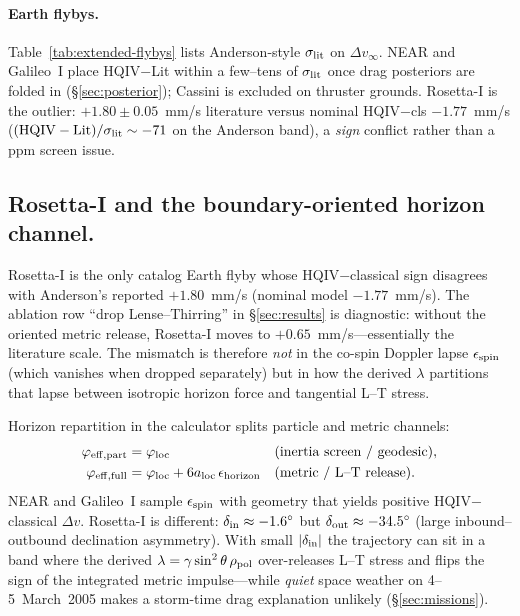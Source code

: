 \documentclass[11pt]{amsart}
\begin{document}
\paragraph{Earth flybys.}
Table~\ref{tab:extended-flybys} lists Anderson-style $\sigma_{\rm lit}$ on $\Delta v_\infty$.
NEAR and Galileo~I place HQIV$-$Lit within a few--tens of $\sigma_{\rm lit}$ once drag
posteriors are folded in (\S\ref{sec:posterior}); Cassini is excluded on thruster grounds.
Rosetta-I is the outlier: $+1.80\pm0.05$~mm/s literature versus nominal HQIV$-$cls
$-1.77$~mm/s ($( \mathrm{HQIV}-\mathrm{Lit})/\sigma_{\rm lit}\sim -71$ on the Anderson
band), a \emph{sign} conflict rather than a ppm screen issue.

\subsection*{Rosetta-I and the boundary-oriented horizon channel.}
\label{sec:rosetta}

Rosetta-I is the only catalog Earth flyby whose HQIV$-$classical sign disagrees with
Anderson's reported $+1.80$~mm/s (nominal model $-1.77$~mm/s). The ablation row ``drop
Lense--Thirring'' in \S\ref{sec:results} is diagnostic: without the oriented metric release,
Rosetta-I moves to $+0.65$~mm/s---essentially the literature scale. The mismatch is therefore
\emph{not} in the co-spin Doppler lapse $\epsilon_{\rm spin}$ (which vanishes when dropped
separately) but in how the derived $\lambda$ partitions that lapse between isotropic horizon
force and tangential L--T stress.

Horizon repartition in the calculator splits particle and metric channels:
\begin{align}
\varphi_{\rm eff,part} &= \varphi_{\rm loc}
  &&\text{(inertia screen / geodesic)},\\
\varphi_{\rm eff,full} &= \varphi_{\rm loc}+6a_{\rm loc}\,\epsilon_{\rm horizon}
  &&\text{(metric / L--T release)}.
\end{align}
NEAR and Galileo~I sample $\epsilon_{\rm spin}$ with geometry that yields positive
HQIV$-$classical $\Delta v$. Rosetta-I is different: $\delta_{\rm in}\approx -1.6^\circ$ but
$\delta_{\rm out}\approx -34.5^\circ$ (large inbound--outbound declination asymmetry). With
small $|\delta_{\rm in}|$ the trajectory can sit in a band where the derived
$\lambda=\gamma\sin^2\theta\,\rho_{\rm pol}$ over-releases L--T stress and flips the sign
of the integrated metric impulse---while \emph{quiet} space weather on 4--5~March~2005
makes a storm-time drag explanation unlikely (\S\ref{sec:missions}).
\end{document}
